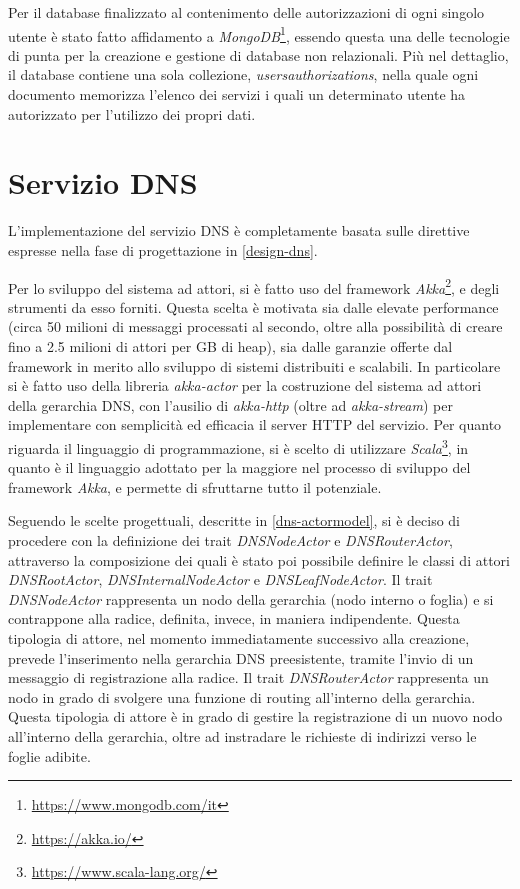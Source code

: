 \documentclass[a4paper,12pt]{report}
\begin{document}
Per il database finalizzato al contenimento delle autorizzazioni di ogni singolo utente è stato fatto affidamento a \emph{MongoDB}\footnote{\url{https://www.mongodb.com/it}}, essendo questa una delle tecnologie di punta per la creazione e gestione di database non relazionali. Più nel dettaglio, il database contiene una sola collezione, \emph{usersauthorizations}, nella quale ogni documento memorizza l'elenco dei servizi i quali un determinato utente ha autorizzato per l'utilizzo dei propri dati.   

\section{Servizio DNS}
L'implementazione del servizio DNS è completamente basata sulle direttive espresse nella fase di progettazione in \autoref{design-dns}. 

Per lo sviluppo del sistema ad attori, si è fatto uso del
framework \emph{Akka}\footnote{\url{https://akka.io/}}, e degli strumenti da esso forniti. Questa scelta è motivata sia dalle elevate performance (circa 50 milioni di messaggi processati al secondo, oltre alla possibilità di creare fino a 2.5 milioni di attori per GB di heap), sia dalle garanzie offerte dal framework in merito allo sviluppo di sistemi distribuiti e scalabili. In particolare si è fatto uso della libreria \emph{akka-actor} per la costruzione del sistema ad attori della gerarchia DNS, con l'ausilio di \emph{akka-http} (oltre ad \emph{akka-stream}) per implementare con semplicità ed efficacia il server HTTP del servizio. Per quanto riguarda il linguaggio di programmazione, si è scelto di utilizzare \emph{Scala}\footnote{\url{https://www.scala-lang.org/}}, in quanto è il linguaggio adottato per la maggiore nel processo di sviluppo del framework \emph{Akka}, e permette di sfruttarne tutto il 
potenziale.

Seguendo le scelte progettuali, descritte in \autoref{dns-actormodel}, si è deciso di procedere con la definizione dei trait \emph{DNSNodeActor} e \emph{DNSRouterActor}, attraverso la composizione dei quali è stato poi possibile definire le classi di attori \emph{DNSRootActor}, \emph{DNSInternalNodeActor} e \emph{DNSLeafNodeActor}. Il trait \emph{DNSNodeActor} rappresenta un nodo della gerarchia (nodo interno o foglia) e si contrappone alla radice, definita, invece, in maniera indipendente. Questa tipologia di attore, nel momento immediatamente successivo alla creazione, prevede l'inserimento nella gerarchia DNS preesistente, tramite l'invio di un messaggio di registrazione alla radice. Il trait \emph{DNSRouterActor} rappresenta un nodo in grado di svolgere una funzione di routing all'interno della gerarchia. Questa tipologia di attore è in grado di gestire la registrazione di un nuovo nodo all'interno della gerarchia, oltre ad instradare le richieste di indirizzi verso le foglie adibite.
\end{document}
